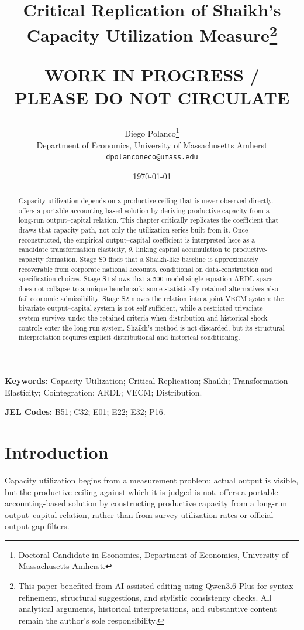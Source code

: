 \documentclass[11pt]{article}
\title{Critical Replication of Shaikh's Capacity Utilization Measure\thanks{This paper benefited from AI-assisted editing using Qwen3.6 Plus for syntax refinement, structural suggestions, and stylistic consistency checks. All analytical arguments, historical interpretations, and substantive content remain the author's sole responsibility.}\\
\begin{large}
\textbf{WORK IN PROGRESS / PLEASE DO NOT CIRCULATE}     
\end{large}
}
\author{Diego Polanco\thanks{Doctoral Candidate in Economics, Department of Economics, University of Massachusetts Amherst.}\\
Department of Economics, University of Massachusetts Amherst\\
\texttt{dpolanconeco@umass.edu}}
\date{\today}
\begin{document}
\maketitle


\begin{abstract}
Capacity utilization depends on a productive ceiling that is never observed directly. \citet{Shaikh2016} offers a portable accounting-based solution by deriving productive capacity from a long-run output--capital relation. This chapter critically replicates the coefficient that draws that capacity path, not only the utilization series built from it. Once reconstructed, the empirical output--capital coefficient is interpreted here as a candidate transformation elasticity, $\theta$, linking capital accumulation to productive-capacity formation. Stage S0 finds that a Shaikh-like baseline is approximately recoverable from corporate national accounts, conditional on data-construction and specification choices. Stage S1 shows that a 500-model single-equation ARDL space does not collapse to a unique benchmark; some statistically retained alternatives also fail economic admissibility. Stage S2 moves the relation into a joint VECM system: the bivariate output--capital system is not self-sufficient, while a restricted trivariate system survives under the retained criteria when distribution and historical shock controls enter the long-run system. Shaikh's method is not discarded, but its structural interpretation requires explicit distributional and historical conditioning.
\end{abstract}


\vspace{1cm}

\noindent\textbf{Keywords:} Capacity Utilization; Critical Replication; Shaikh; Transformation Elasticity; Cointegration; ARDL; VECM; Distribution.

\noindent\textbf{JEL Codes:} B51; C32; E01; E22; E32; P16.

\pagebreak
\section{Introduction}
\label{sec:introduction}

Capacity utilization begins from a measurement problem: actual output is visible, but the productive ceiling against which it is judged is not. \citet{Shaikh2016} offers a portable accounting-based solution by constructing productive capacity from a long-run output--capital relation, rather than from survey utilization rates or official output-gap filters.
\end{document}
